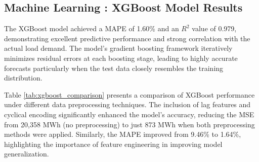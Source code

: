  \subsection{Machine Learning  : XGBoost Model Results}
 
The XGBoost model achieved a MAPE of 1.60\% and an $R^2$ value of 0.979, demonstrating excellent predictive performance and strong correlation with the actual load demand. The model’s gradient boosting framework iteratively minimizes residual errors at each boosting stage, leading to highly accurate forecasts particularly when the test data closely resembles the training distribution.


 \begin{table}[h!]
 	\centering
 	\small
 	\caption{Comparison of XGBoost Results with Different Data Processing Techniques}
 		
 	\label{tab:xgboost_comparison}
 \end{table}
 Table \ref{tab:xgboost_comparison} presents a comparison of XGBoost performance under different data preprocessing techniques. The inclusion of lag features and cyclical encoding significantly enhanced the model’s accuracy, reducing the MSE from 20,358 MWh (no preprocessing) to just 873 MWh when both preprocessing methods were applied. Similarly, the MAPE improved from 9.46\% to 1.64\%, highlighting the importance of feature engineering in improving model generalization.

